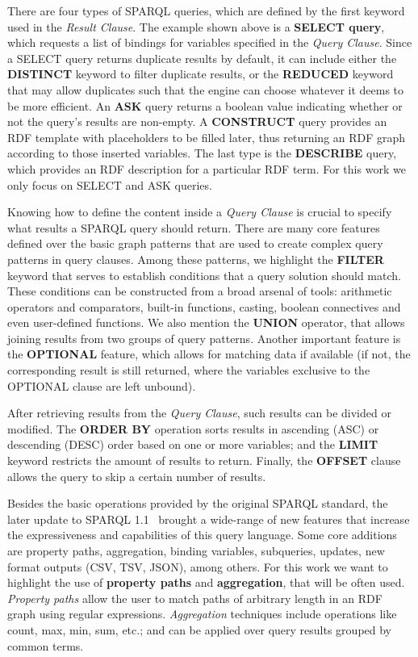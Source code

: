 There are four types of SPARQL queries, which are defined by the first keyword used in the 
\textit{Result Clause}. The example shown above is a \textbf{SELECT query}, which requests a list 
of bindings for variables specified in the \textit{Query Clause}. Since a SELECT query returns 
duplicate results by default, it can include either the \textbf{DISTINCT} keyword to filter 
duplicate results, or the \textbf{REDUCED} keyword that may allow duplicates such that the engine 
can choose whatever it deems to be more efficient. An \textbf{ASK} query returns a boolean value 
indicating whether or not the query’s results are non-empty. A \textbf{CONSTRUCT} query provides 
an RDF template with placeholders to be filled later, thus returning an RDF graph according to 
those inserted variables. The last type is the \textbf{DESCRIBE} query, which provides an RDF 
description for a particular RDF term. For this work we only focus on SELECT and ASK queries.

Knowing how to define the content inside a \textit{Query Clause} is crucial to specify what results 
a SPARQL query should return. There are many core features defined over the basic graph patterns 
that are used to create complex query patterns in query clauses. Among these patterns, we highlight 
the \textbf{FILTER} keyword that serves to establish conditions that a query solution should match. 
These conditions can be constructed from a broad arsenal of tools: arithmetic operators and 
comparators, built-in functions, casting, boolean connectives and even user-defined functions. 
We also mention the \textbf{UNION} operator, that allows joining results from two groups of query 
patterns. Another important feature is the \textbf{OPTIONAL} feature, which allows for matching 
data if available (if not, the corresponding result is still returned, where the variables 
exclusive to the OPTIONAL clause are left unbound).

After retrieving results from the \textit{Query Clause}, such results can be divided or modified. 
The \textbf{ORDER BY} operation sorts results in ascending (ASC) or descending (DESC) order based 
on one or more variables; and the \textbf{LIMIT} keyword restricts the amount of results to return. 
Finally, the \textbf{OFFSET} clause allows the query to skip a certain number of results.

Besides the basic operations provided by the original SPARQL standard, the later update to 
SPARQL 1.1~\cite{key:sparql11} brought a wide-range of new features that increase the expressiveness 
and capabilities of this query language. Some core additions are property paths, aggregation, 
binding variables, subqueries, updates, new format outputs (CSV, TSV, JSON), among others. 
For this work we want to highlight the use of \textbf{property paths} and \textbf{aggregation}, 
that will be often used. \textit{Property paths} allow the user to match paths of arbitrary 
length in an RDF graph using regular expressions. \textit{Aggregation} techniques include 
operations like count, max, min, sum, etc.; and can be applied over query results grouped 
by common terms.


